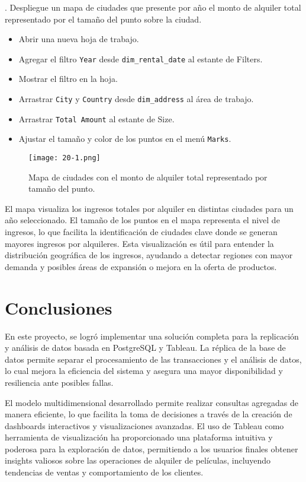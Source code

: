 \documentclass{article}
\begin{document}
. Despliegue un mapa de ciudades que presente por año el monto de alquiler total representado por el tamaño del punto sobre la ciudad.

\begin{itemize}
    \item Abrir una nueva hoja de trabajo.
    \item Agregar el filtro \texttt{Year} desde \texttt{dim\_rental\_date} al estante de Filters.
    \item Mostrar el filtro en la hoja.
    \item Arrastrar \texttt{City} y \texttt{Country} desde \texttt{dim\_address} al área de trabajo.
    \item Arrastrar \texttt{Total Amount} al estante de Size.
    \item Ajustar el tamaño y color de los puntos en el menú \texttt{Marks}.
\end{itemize}


\begin{figure}[h]
    \centering
    \texttt{[image: 20-1.png]} %
    \caption{Mapa de ciudades con el monto de alquiler total representado por tamaño del punto.}
    \label{fig:mapa-alquileres-ciudades}
\end{figure}

El mapa visualiza los ingresos totales por alquiler en distintas ciudades para un año seleccionado. El tamaño de los puntos en el mapa representa el nivel de ingresos, lo que facilita la identificación de ciudades clave donde se generan mayores ingresos por alquileres. Esta visualización es útil para entender la distribución geográfica de los ingresos, ayudando a detectar regiones con mayor demanda y posibles áreas de expansión o mejora en la oferta de productos.

\newpage
\section{Conclusiones}

En este proyecto, se logró implementar una solución completa para la replicación y análisis de datos basada en PostgreSQL y Tableau. La réplica de la base de datos permite separar el procesamiento de las transacciones y el análisis de datos, lo cual mejora la eficiencia del sistema y asegura una mayor disponibilidad y resiliencia ante posibles fallas.

El modelo multidimensional desarrollado permite realizar consultas agregadas de manera eficiente, lo que facilita la toma de decisiones a través de la creación de dashboards interactivos y visualizaciones avanzadas. El uso de Tableau como herramienta de visualización ha proporcionado una plataforma intuitiva y poderosa para la exploración de datos, permitiendo a los usuarios finales obtener insights valiosos sobre las operaciones de alquiler de películas, incluyendo tendencias de ventas y comportamiento de los clientes.
\end{document}
